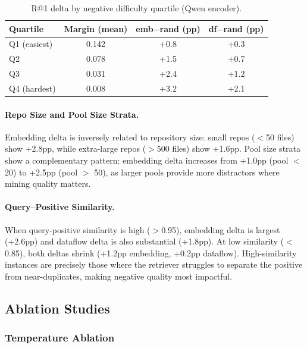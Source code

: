 \documentclass[11pt]{article}
\begin{document}
\begin{table}[h]
\centering
\caption{R@1 delta by negative difficulty quartile (Qwen encoder).}
\label{tab:neg_difficulty}
\begin{tabular}{lccc}
\toprule
\textbf{Quartile} & \textbf{Margin (mean)} & \textbf{emb$-$rand (pp)} & \textbf{df$-$rand (pp)} \\
\midrule
Q1 (easiest) & 0.142 & +0.8 & +0.3 \\
Q2 & 0.078 & +1.5 & +0.7 \\
Q3 & 0.031 & +2.4 & +1.2 \\
Q4 (hardest) & 0.008 & +3.2 & +2.1 \\
\bottomrule
\end{tabular}
\end{table}

\paragraph{Repo Size and Pool Size Strata.}
Embedding delta is inversely related to repository size: small repos ($<$50 files) show +2.8pp, while extra-large repos ($>$500 files) show +1.6pp.
Pool size strata show a complementary pattern: embedding delta increases from +1.0pp (pool $<$ 20) to +2.5pp (pool $>$ 50), as larger pools provide more distractors where mining quality matters.

\paragraph{Query--Positive Similarity.}
When query-positive similarity is high ($>$0.95), embedding delta is largest (+2.6pp) and dataflow delta is also substantial (+1.8pp).
At low similarity ($<$0.85), both deltas shrink (+1.2pp embedding, +0.2pp dataflow).
High-similarity instances are precisely those where the retriever struggles to separate the positive from near-duplicates, making negative quality most impactful.

\subsection{Ablation Studies}
\label{sec:ablations}

\subsubsection{Temperature Ablation}
\label{sec:temp_ablation}
\end{document}
